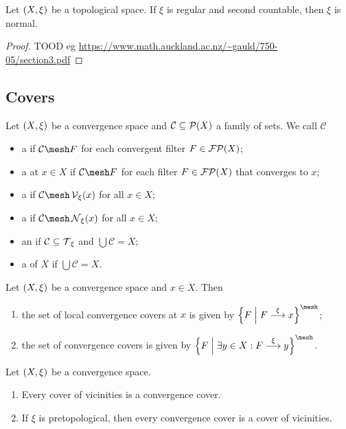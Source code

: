 \begin{proposition} \label{countableRegularityImpliesNormality}
Let $\sSet{X,\xi}$ be a topological space. If $\xi$ is regular and second countable, then $\xi$ is normal.
\end{proposition}
\begin{proof}
TOOD eg \url{https://www.math.auckland.ac.nz/~gauld/750-05/section3.pdf}
\end{proof}


\subsection{Covers}
\begin{definition}
Let $\sSet{X,\xi}$ be a convergence space and $\mathcal{C}\subseteq \operatorname{\mathcal{P}}(X)$ a family of sets. We call $\mathcal{C}$ 
\begin{itemize}
\item a  if $\mathcal{C}\mesh F$ for each convergent filter $F\in\operatorname{\mathcal{FP}}(X)$;
\item a  at $x\in X$ if $\mathcal{C}\mesh F$ for each filter $F\in\operatorname{\mathcal{FP}}(X)$ that converges to $x$;
\item a  if $\mathcal{C}\mesh \vicinity_\xi(x)$ for all $x\in X$;
\item a  if $\mathcal{C}\mesh \neighbourhood_\xi(x)$ for all $x\in X$;
\item an  if $\mathcal{C} \subseteq \operatorname{\mathcal{T}}_\xi$ and $\bigcup \mathcal{C} = X$;
\item a  of $X$ if $\bigcup \mathcal{C} = X$.
\end{itemize}
\end{definition}

\begin{lemma}
Let $\sSet{X,\xi}$ be a convergence space and $x\in X$. Then
\begin{enumerate}
\item the set of local convergence covers at $x$ is given by $\setbuilder{F}{F\overset{\xi}{\longrightarrow} x}^\mesh$;
\item the set of convergence covers is given by $\setbuilder{F}{\exists y\in X: F\overset{\xi}{\longrightarrow} y}^\mesh$.
\end{enumerate}
\end{lemma}

\begin{lemma}
Let $\sSet{X,\xi}$ be a convergence space.
\begin{enumerate}
\item Every cover of vicinities is a convergence cover.
\item If $\xi$ is pretopological, then every convergence cover is a cover of vicinities.
\end{enumerate}
\end{lemma}

